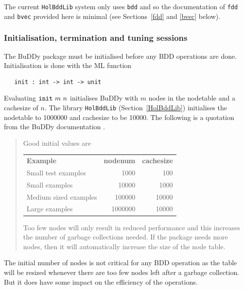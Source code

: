 \documentclass[12pt,fleqn]{book}
\renewcommand{\t}[1]{\mbox{\tt #1}}
\newcommand{\Buddy}{BuDDy{}}
\newcommand\HolBuddy{\texttt{HolBddLib}{}}
\begin{document}
The current \HolBuddy{} system only uses \t{bdd} and so
the documentation of \t{fdd} and \t{bvec} provided here is minimal
(see Sections~\ref{fdd} and \ref{bvec} below).

\subsubsection{Initialisation, termination and tuning sessions}\label{init}

The \Buddy{} package must be initialised before any BDD operations are done.
Initialisation is done with the ML function

\begin{verbatim}
   init : int -> int -> unit
\end{verbatim}

Evaluating $\t{init}~m~n$ initialises \Buddy{} with $m$ nodes in the
nodetable and a cachesize of $n$.  
The library \t{HolBddLib} (Section~\ref{HolBddLib}) 
initialises the nodetable to 1000000 and cachesize to
be 10000. The following is a quotation from the \Buddy{} documentation \cite{BuDDy}.

\vspace*{-2mm}

{\baselineskip8pt\begin{quote}\footnotesize
Good initial values are

\smallskip

\begin{tabular}{lrr}
{\bf Example} & {\bf nodenum} & {\bf cachesize} \\
Small test examples   & 1000    & 100\\
Small examples        & 10000   & 1000 \\
Medium sized examples & 100000  & 10000\\
Large examples        & 1000000 & 10000
\end{tabular}

\smallskip

Too few nodes will only result in reduced performance and this
increases the number of garbage collections needed. If the package
needs more nodes, then it will automatically increase the size of the
node table.
\end{quote}}

The initial number of nodes is not critical for any BDD operation
as the table will be resized whenever there are too few nodes left
after a garbage collection.  But it does have some impact on the
efficiency of the operations.
\end{document}
